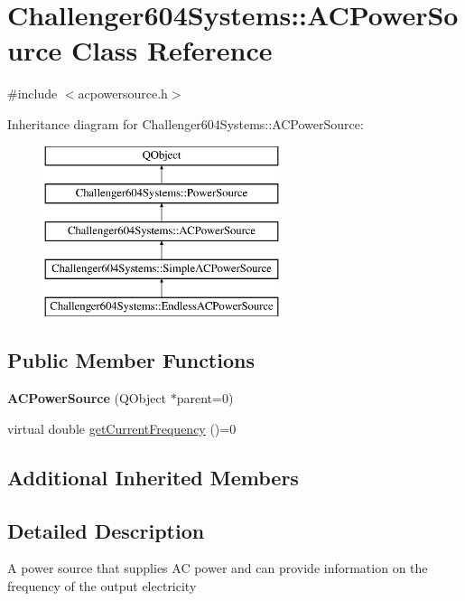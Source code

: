 \hypertarget{class_challenger604_systems_1_1_a_c_power_source}{\section{Challenger604\-Systems\-:\-:A\-C\-Power\-Source Class Reference}
\label{class_challenger604_systems_1_1_a_c_power_source}
}


{\ttfamily \#include $<$acpowersource.\-h$>$}

Inheritance diagram for Challenger604\-Systems\-:\-:A\-C\-Power\-Source\-:\begin{figure}[H]
\begin{center}
\leavevmode
\includegraphics[height=5.000000cm]{class_challenger604_systems_1_1_a_c_power_source}
\end{center}
\end{figure}
\subsection*{Public Member Functions}
\begin{DoxyCompactItemize}
\item 
\hypertarget{class_challenger604_systems_1_1_a_c_power_source_a6574e889b593bce74090d191df02b4dd}{{\bfseries A\-C\-Power\-Source} (Q\-Object $\ast$parent=0)}\label{class_challenger604_systems_1_1_a_c_power_source_a6574e889b593bce74090d191df02b4dd}

\item 
virtual double \hyperlink{class_challenger604_systems_1_1_a_c_power_source_a022e5462d16a445f4703add09778dce4}{get\-Current\-Frequency} ()=0
\end{DoxyCompactItemize}
\subsection*{Additional Inherited Members}


\subsection{Detailed Description}
A power source that supplies A\-C power and can provide information on the frequency of the output electricity 

